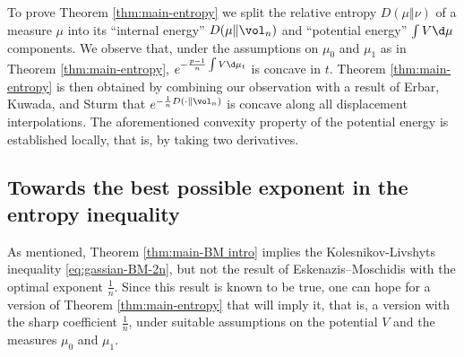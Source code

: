 To prove Theorem \ref{thm:main-entropy} we split the relative entropy $D(\mu \Vert \nu)$ of a measure $\mu$ into its ``internal energy'' $D(\mu \Vert \vol_{n})$ and ``potential energy'' $\int V \d \mu$ components. We observe that, under the assumptions on $\mu_{0}$ and $\mu_{1}$ as in Theorem \ref{thm:main-entropy}, $e^{- \frac{p-1}{n} \int V \d \mu_{t}}$ is concave in $t$. Theorem \ref{thm:main-entropy} is then obtained by combining our observation with a result of Erbar, Kuwada, and Sturm \cite{ErbarKuwadaSturm15} that $e^{- \frac{1}{n} D(\cdot \Vert \vol_{n})}$ is concave along all displacement interpolations. The aforementioned convexity property of the potential energy is established locally, that is, by taking two derivatives. 

\subsection{Towards the best possible exponent in the entropy inequality}

As mentioned, Theorem \ref{thm:main-BM intro} implies the Kolesnikov-Livshyts inequality \eqref{eq:gassian-BM-2n}, but not the result of Eskenazis--Moschidis with the optimal exponent $\frac{1}{n}$. Since this result is 
known to be true, one can hope for a version of Theorem \ref{thm:main-entropy} that will imply it, that is, a version with the sharp coefficient $\frac{1}{n}$, under suitable assumptions on the potential $V$ and the measures $\mu_0$ and $\mu_1$. 

